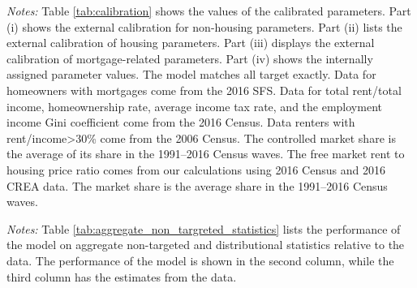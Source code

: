 \documentclass[parskip=full]{article}
\newenvironment{fignote2}[1]
{
\par
\medskip
\begin{minipage}{#1}
\footnotesize
}
{
\end{minipage}
}
\begin{document}
\begin{table}[H]
    \centering
    \caption{Assigned parameter values}
    \vspace{-0.75cm}
    \label{tab:calibration}
    
    \vspace{-0.5cm}
    \begin{fignote2}{1.07\textwidth}
    \textit{Notes:} Table \ref{tab:calibration} shows the values of the calibrated parameters. Part (i) shows the external calibration for non-housing parameters. Part (ii) lists the external calibration of housing parameters. Part (iii) displays the external calibration of mortgage-related parameters. Part (iv) shows the internally assigned parameter values. The model matches all target exactly. Data for homeowners with mortgages come from the 2016 SFS. Data for total rent/total income, homeownership rate, average income tax rate, and the employment income Gini coefficient come from the 2016 Census. Data renters with rent/income>30\% come from the 2006 Census. The controlled market share is the average of its share in the 1991--2016 Census waves. The free market rent to housing price ratio comes from our calculations using 2016 Census and 2016 CREA data. The market share is the average share in the 1991--2016 Census waves.
    \end{fignote2}
\end{table}

\begin{table}[H]
    \centering
    \caption{Aggregate non-targeted statistics}
    \vspace{-0.5cm}
    \label{tab:aggregate_non_targreted_statistics}  
    \vspace{-0.45cm}
    \begin{fignote2}{0.91\textwidth}
      \textit{Notes:} Table \ref{tab:aggregate_non_targreted_statistics} lists the performance of the model on aggregate non-targeted and distributional statistics relative to the data. The performance of the model is shown in the second column, while the third column has the estimates from the data. 
    \end{fignote2}
\end{table}
\end{document}
